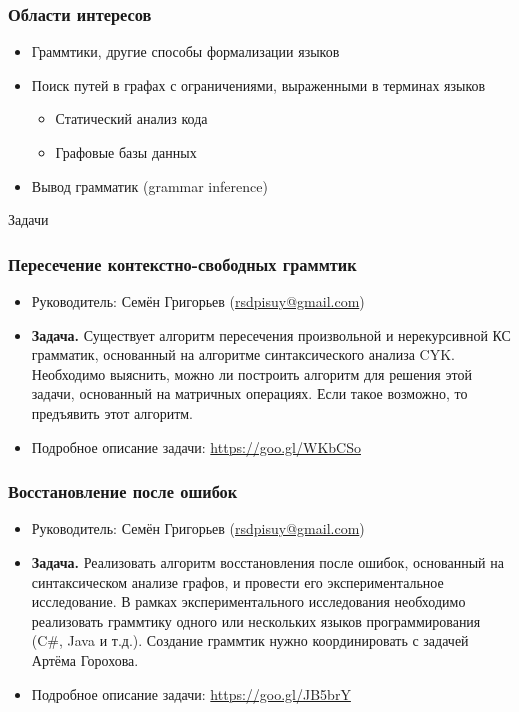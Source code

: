 \documentclass{beamer}
\begin{document}
\begin{frame}[fragile]
  \transwipe[direction=90]
  \frametitle{Области интересов}
  \begin{itemize}
    \item Граммтики, другие способы формализации языков
    \item Поиск путей в графах с ограничениями, выраженными в терминах языков
    \begin{itemize}
      \item Статический анализ кода
      \item Графовые базы данных
    \end{itemize}
    \item Вывод грамматик (grammar inference)
  \end{itemize}
\end{frame}

\begin{frame}[plain,c]
 \transwipe[direction=90]
 \begin{center}
  \Huge Задачи
 \end{center}
\end{frame}

\begin{frame}
  \transwipe[direction=90]
  \frametitle{Пересечение контекстно-свободных граммтик}
  \begin{itemize}
    \item Руководитель: Семён Григорьев (\url{rsdpisuy@gmail.com})
    \item \textbf{Задача.} Существует алгоритм пересечения произвольной и нерекурсивной КС грамматик, основанный на алгоритме синтаксического анализа CYK. 
    Необходимо выяснить, можно ли построить алгоритм для решения этой задачи, основанный на матричных операциях. Если такое возможно, то предъявить этот алгоритм.   
    \item Подробное описание задачи: \url{https://goo.gl/WKbCSo}
  \end{itemize}
\end{frame}

\begin{frame}
  \transwipe[direction=90]
  \frametitle{Восстановление после ошибок}
  \begin{itemize}
    \item Руководитель: Семён Григорьев (\url{rsdpisuy@gmail.com})
    \item \textbf{Задача.} Реализовать алгоритм восстановления после ошибок, основанный на синтаксическом анализе графов, и провести его экспериментальное исследование.
    В рамках экспериментального исследования необходимо реализовать граммтику одного или нескольких языков программирования (C\#, Java и т.д.).
    Создание граммтик нужно координировать с задачей Артёма Горохова. 
    \item Подробное описание задачи: \url{https://goo.gl/JB5brY}
  \end{itemize}
\end{frame}
\end{document}
